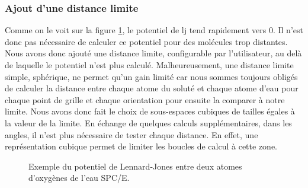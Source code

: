 \subsubsection{Ajout d'une distance limite}
Comme on le voit sur la figure \ref{fig:lj}, le potentiel de lj tend rapidement vers 0. Il n'est donc pas nécessaire de calculer ce potentiel pour des molécules trop distantes. Nous avons donc ajouté une distance limite, configurable par l'utilisateur, au delà de laquelle le potentiel n'est plus calculé. Malheureusement, une distance limite simple, sphérique, ne permet qu'un gain limité car nous sommes toujours obligés de calculer la distance entre chaque atome du soluté et chaque atome d'eau pour chaque point de grille et chaque orientation pour ensuite la comparer à notre limite. Nous avons donc fait le choix de sous-espaces cubiques de tailles égales à la valeur de la limite. En échange de quelques calculs supplémentaires, dans les angles, il n'est plus nécessaire de tester chaque distance. En effet, une représentation cubique permet de limiter les boucles de calcul à cette zone.




\begin{figure}[H]
    \center    
    \caption{Exemple du potentiel de Lennard-Jones entre deux atomes d'oxygènes de l'eau SPC/E.}
    \label{fig:lj}
\end{figure}


